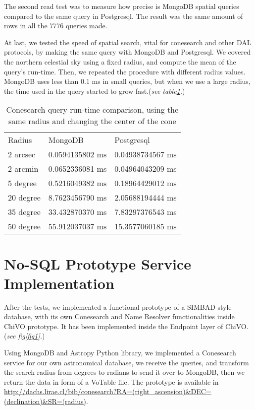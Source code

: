 \documentclass[11pt,twoside]{article}
\begin{document}
    The second read test was to measure how precise is MongoDB spatial queries
    compared to the same query in Postgresql.
    The result was the same amount of rows in all the 7776 queries made.
                
    At last, we tested the speed of spatial search, vital for conesearch and
    other DAL protocols, by making the same query with MongoDB 
    and Postgresql. We covered the northern celestial sky using a fixed radius,
    and compute the mean of the query's run-time. Then, we repeated the
    procedure with different radius values. MongoDB uses less than 0.1 ms in small queries, 
    but when we use a large radius, the time used
    in the query started to grow fast.(\emph{see table\ref{table:cone}.})
\begin{table}
\centering
\begin{tabular}{lll}
 Radius &MongoDB &Postgresql\\
2 arcsec&   0.0594135802 ms &0.04938734567 ms\\
2 arcmin&   0.0652336081 ms &0.04964043209 ms\\
5 degree&   0.5216049382 ms& 0.18964429012 ms\\ 
20 degree & 8.7623456790 ms& 2.05688194444 ms\\
35 degree & 33.432870370 ms& 7.83297376543 ms\\
50 degree & 55.912037037 ms& 15.3577060185 ms
\end{tabular}


\caption{Conesearch query run-time comparison, using the same radius and changing the center of the cone}
\label{table:cone}
\end{table}    

\section{No-SQL Prototype Service Implementation}

  After the tests, we implemented a functional prototype of a SIMBAD style database, with its own Conesearch and Name Resolver functionalities
inside ChiVO prototype. It has been implemented inside the Endpoint layer of ChiVO. (\emph{see fig\ref{fig1}.})

  
  Using MongoDB and Astropy Python library, we implemented a Conesearch service for our own astronomical database, we receive the queries, and
  transform the search radius from degrees to radians to send it over to MongoDB, then we return the data in form of a VoTable file. The prototype is available in
  \url{http://dachs.lirae.cl/bib/conesearch?RA=(right_ascension)&DEC=(declination)&SR=(radius)}.
  
\end{document}
